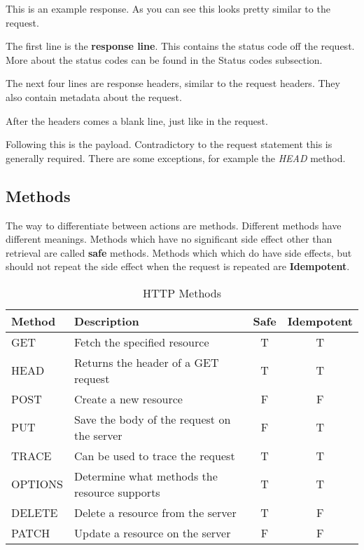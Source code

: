 This is an example response.
As you can see this looks pretty similar to the request.

The first line is the {\bf response line}.
This contains the status code off the request.
More about the status codes can be found in the Status codes subsection.

The next four lines are response headers, similar to the request headers.
They also contain metadata about the request.

After the headers comes a blank line, just like in the request.

Following this is the payload.
Contradictory to the request statement this is generally required.
There are some exceptions, for example the {\it HEAD} method.

\subsection{Methods}
The way to differentiate between actions are methods.
Different methods have different meanings.
Methods which have no significant side effect other than retrieval are called {\bf safe} methods.
Methods which which do have side effects,
but should not repeat the side effect when the request is repeated are {\bf Idempotent}.

\begin{table}[h]
	\centering
	\begin{tabular} {l | l | c | c}
		Method  & Description                                  & Safe & Idempotent \\
		\hline
		GET     & Fetch the specified resource                 & T    & T          \\
		HEAD    & Returns the header of a GET request          & T    & T          \\
		POST    & Create a new resource                        & F    & F          \\
		PUT     & Save the body of the request on the server   & F    & T          \\
		TRACE   & Can be used to trace the request             & T    & T          \\
		OPTIONS & Determine what methods the resource supports & T    & T          \\
		DELETE  & Delete a resource from the server            & T    & F          \\
		PATCH   & Update a resource on the server              & F    & F          \\
	\end{tabular}
	\caption{HTTP Methods}
\end{table}

